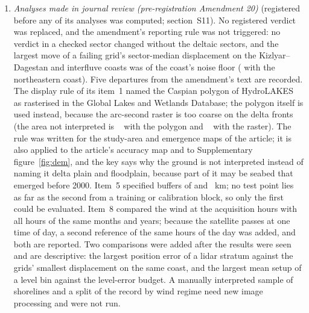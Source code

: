 \begin{enumerate}
\item \emph{Analyses made in journal review (pre-registration Amendment 20)} (registered before any of its analyses was computed; section~S11). No registered verdict was replaced, and the amendment's reporting rule was not triggered: no verdict in a checked sector changed without the deltaic sectors, and the largest move of a failing grid's sector-median displacement on the Kizlyar--Dagestan and interfluve coasts was  of the coast's noise floor ( with the northeastern coast). Five departures from the amendment's text are recorded. The display rule of its item~1 named the Caspian polygon of HydroLAKES as rasterised in the Global Lakes and Wetlands Database; the polygon itself is used instead, because the  arc-second raster is too coarse on the delta fronts (the area not interpreted is ~\kmsq{} with the polygon and ~\kmsq{} with the raster). The rule was written for the study-area and emergence maps of the article; it is also applied to the article's accuracy map and to Supplementary figure~\ref{fig:dem}, and the key says why the ground is not interpreted instead of naming it delta plain and floodplain, because part of it may be seabed that emerged before 2000. Item~5 specified buffers of  and ~km; no test point lies as far as the second from a training or calibration block, so only the first could be evaluated. Item~8 compared the wind at the acquisition hours with all hours of the same months and years; because the satellite passes at one time of day, a second reference of the same hours of the day was added, and both are reported. Two comparisons were added after the results were seen and are descriptive: the largest position error of a lidar stratum against the grids' smallest displacement on the same coast, and the largest mean setup of a level bin against the level-error budget. A manually interpreted sample of shorelines and a split of the record by wind regime need new image processing and were not run.
\end{enumerate}
